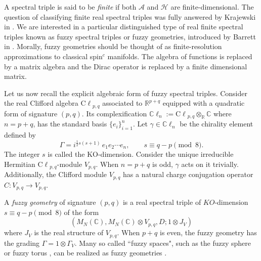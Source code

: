 \documentclass[11pt]{article}
\theoremstyle{plain}
\begin{document}
A spectral triple is said to be \emph{finite} if both $\mathcal{A}$ and $\mathcal{H}$ are
finite-dimensional.  The question of classifying  finite real spectral triples was fully answered by Krajewski in \cite{Finite spectral triples}. We are interested in a particular distinguished type of real finite spectral triples known as  fuzzy spectral triples
or fuzzy geometries, introduced by
Barrett in \cite{Barrett2015}. Morally, fuzzy geometries should be thought of as
finite-resolution approximations to classical spin$^c$ manifolds. The
algebra of functions is replaced by a matrix algebra and the Dirac
operator is replaced by a finite dimensional matrix.

Let us now recall the explicit algebraic form of fuzzy spectral triples. Consider the real Clifford algebra $\mathrm{C\ell}_{p,q}$ associated to
$\mathbb{R}^{p+q}$ equipped with a quadratic form of signature $(p,q)$. Its complexification $\mathbb{C}\ell_n := \mathrm{C\ell}_{p,q} \otimes_{\mathbb{R}} \mathbb{C}$ where $n =p+q$, has the standard basis $\{ e_i \}_{i=1}^{n}$. 
Let $\gamma \in\mathbb{C}\ell_n$ be the chirality element defined by
\[
\Gamma = i^{\frac{1}{2}s(s+1)}\, e_1 e_2 \cdots e_n ,\qquad
s \equiv q - p \pmod 8.
\]
The integer $s$ is called the KO-dimension.  Consider the unique irreducible Hermitian $\mathrm{C\ell}_{p,q}$-module $V_{p,q}$.  When $n=p+q$ is odd, $\gamma$ acts on it trivially.  Additionally, the Clifford module $V_{p,q}$  has a natural charge conjugation operator
$C : V_{p,q}\to V_{p,q}$. 


 A \textit{fuzzy geometry} of signature $(p, q)$  is a real spectral triple of $K O$-dimension $s \equiv q - p \pmod 8$ of the form
$$
\left(M_N(\mathbb{C}), M_N(\mathbb{C}) \otimes V_{p,q}, D ; 1 \otimes J_V\right)
$$
where $J_V$ is the real structure of $V_{p,q}$. When $p+q$ is even, the fuzzy geometry has the grading $\Gamma=1 \otimes \Gamma_V$. Many so called ``fuzzy spaces", such as the fuzzy sphere \cite{fuzzy sphere, fuzzy sphere Torres} or fuzzy torus \cite{Fuzzy torus generalized}, can be realized as fuzzy geometries \cite{Fuzzy torus as spectral triple,Barrett2015,glaser deform}.
\end{document}

